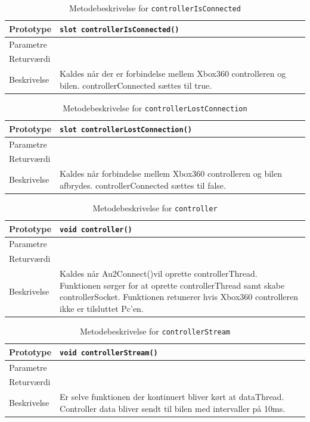 \begin{table}[H]
\begin{tabularx}{\textwidth}{| L{2.5 cm} | Z |} \hline
Prototype & \texttt{slot controllerIsConnected()} \\\hline
Parametre &   \\\hline
Returværdi &  \\\hline
Beskrivelse & Kaldes når der er forbindelse mellem Xbox360 controlleren og bilen. controllerConnected sættes til true.   \\\hline
\end{tabularx}
\caption{Metodebeskrivelse for \texttt{controllerIsConnected}}
\label{table:met_controllerIsConnected}
\end{table}

\begin{table}[H]
\begin{tabularx}{\textwidth}{| L{2.5 cm} | Z |} \hline
Prototype & \texttt{slot controllerLostConnection()} \\\hline
Parametre &   \\\hline
Returværdi &  \\\hline
Beskrivelse & Kaldes når forbindelse mellem Xbox360 controlleren og bilen afbrydes. controllerConnected sættes til false.   \\\hline
\end{tabularx}
\caption{Metodebeskrivelse for \texttt{controllerLostConnection}}
\label{table:met_ccontrollerLostConnection}
\end{table}

\begin{table}[H]
\begin{tabularx}{\textwidth}{| L{2.5 cm} | Z |} \hline
Prototype & \texttt{void controller()} \\\hline
Parametre &   \\\hline
Returværdi &  \\\hline
Beskrivelse & Kaldes når Au2Connect()vil oprette controllerThread. Funktionen sørger for at oprette controllerThread samt skabe controllerSocket. Funktionen retunerer hvis Xbox360 controlleren ikke er tilsluttet Pc'en.   \\\hline
\end{tabularx}
\caption{Metodebeskrivelse for \texttt{controller}}
\label{table:met_controller}
\end{table}

\begin{table}[H]
\begin{tabularx}{\textwidth}{| L{2.5 cm} | Z |} \hline
Prototype & \texttt{void controllerStream()} \\\hline
Parametre &   \\\hline
Returværdi &  \\\hline
Beskrivelse & Er selve funktionen der kontinuert bliver kørt at dataThread. Controller data bliver sendt til bilen med intervaller på 10ms.  \\\hline
\end{tabularx}
\caption{Metodebeskrivelse for \texttt{controllerStream}}
\label{table:met_controllerStream}
\end{table}

